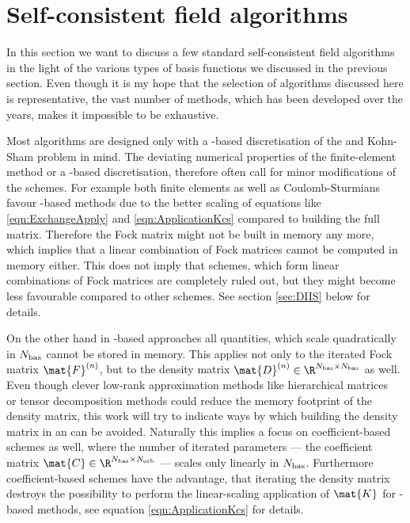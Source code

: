 \section{Self-consistent field algorithms}
\label{sec:SCFAlgorithms}

In this section we want to discuss a few standard self-consistent field algorithms
in the light of the various types of basis functions we discussed in the previous section.
Even though it is my hope that the selection of algorithms discussed here
is representative,
the vast number of methods,
which has been developed over the years,
makes it impossible to be exhaustive.

Most \SCF algorithms are designed only with a \cGTO-based
discretisation of the \HF and Kohn-Sham \DFT problem in mind.
The deviating numerical properties of the finite-element method
or a \CS-based discretisation,
therefore often call for minor modifications of the schemes.
For example both finite elements as well as Coulomb-Sturmians
favour \contract-based methods
due to the better scaling of equations like \eqref{eqn:ExchangeApply}
and \eqref{eqn:ApplicationKcs}
compared to building the full matrix.
Therefore the Fock matrix might not be built in memory any more,
which implies that a linear combination of Fock matrices
cannot be computed in memory either.
This does not imply that \SCF schemes,
which form linear combinations of Fock matrices
are completely ruled out,
but they might become less favourable compared to other schemes.
See section \ref{sec:DIIS} below for details.

On the other hand in \FE-based approaches all quantities,
which scale quadratically in $N_\text{bas}$ cannot be stored in memory.
This applies not only to the iterated Fock matrix $\mat{F}^{(n)}$,
but to the density matrix $\mat{D}^{(n)} \in \R^{\Nbas\times \Nbas}$ as well.
Even though clever low-rank approximation methods
like hierarchical matrices~\cite{Hackbusch1999,Hackbusch2002,Grasedyck2003,Hackbusch2015}
or tensor decomposition methods
could reduce the memory footprint of the density matrix,
this work will try to indicate ways
by which building the density matrix in an \SCF can be avoided.
Naturally this implies
a focus on coefficient-based \SCF schemes as well,
where the number of iterated parameters
--- the coefficient matrix $\mat{C} \in \R^{\Nbas\times\Norb}$ ---
scales only linearly in $N_\text{bas}$.
Furthermore coefficient-based \SCF schemes have the advantage,
that iterating the density matrix
destroys the possibility to perform the
linear-scaling application of $\mat{K}$ for \CS-based methods,
see equation \eqref{eqn:ApplicationKcs} for details.

